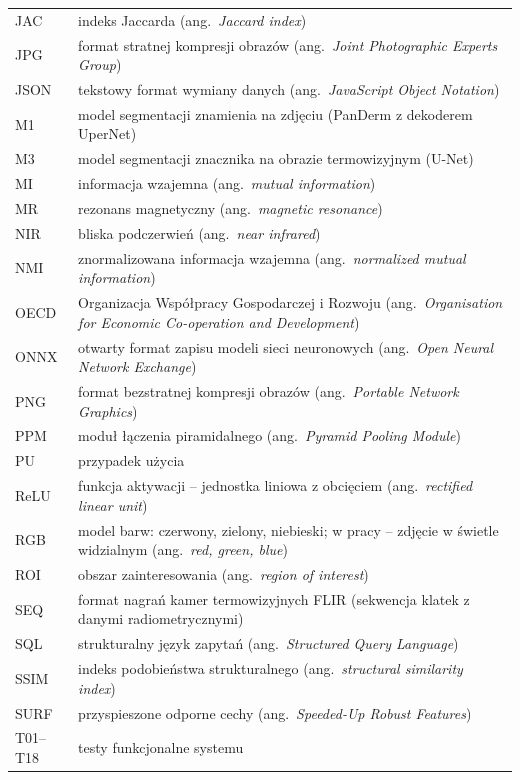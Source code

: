 {\begin{longtable}{@{}p{2.6cm}p{12.2cm}@{}}
  JAC & indeks Jaccarda (ang.~\textit{Jaccard index}) \\
  JPG & format stratnej kompresji obrazów (ang.~\textit{Joint Photographic Experts Group}) \\
  JSON & tekstowy format wymiany danych (ang.~\textit{JavaScript Object Notation}) \\
  M1 & model segmentacji znamienia na zdjęciu (PanDerm z dekoderem UperNet) \\
  M3 & model segmentacji znacznika na obrazie termowizyjnym (U-Net) \\
  MI & informacja wzajemna (ang.~\textit{mutual information}) \\
  MR & rezonans magnetyczny (ang.~\textit{magnetic resonance}) \\
  NIR & bliska podczerwień (ang.~\textit{near infrared}) \\
  NMI & znormalizowana informacja wzajemna (ang.~\textit{normalized mutual information}) \\
  OECD & Organizacja Współpracy Gospodarczej i Rozwoju (ang.~\textit{Organisation for Economic Co-operation and Development}) \\
  ONNX & otwarty format zapisu modeli sieci neuronowych (ang.~\textit{Open Neural Network Exchange}) \\
  PNG & format bezstratnej kompresji obrazów (ang.~\textit{Portable Network Graphics}) \\
  PPM & moduł łączenia piramidalnego (ang.~\textit{Pyramid Pooling Module}) \\
  PU & przypadek użycia \\
  ReLU & funkcja aktywacji -- jednostka liniowa z obcięciem (ang.~\textit{rectified linear unit}) \\
  RGB & model barw: czerwony, zielony, niebieski; w pracy -- zdjęcie w świetle widzialnym (ang.~\textit{red, green, blue}) \\
  ROI & obszar zainteresowania (ang.~\textit{region of interest}) \\
  SEQ & format nagrań kamer termowizyjnych FLIR (sekwencja klatek z danymi radiometrycznymi) \\
  SQL & strukturalny język zapytań (ang.~\textit{Structured Query Language}) \\
  SSIM & indeks podobieństwa strukturalnego (ang.~\textit{structural similarity index}) \\
  SURF & przyspieszone odporne cechy (ang.~\textit{Speeded-Up Robust Features}) \\
  T01--T18 & testy funkcjonalne systemu \\

\end{longtable}}
